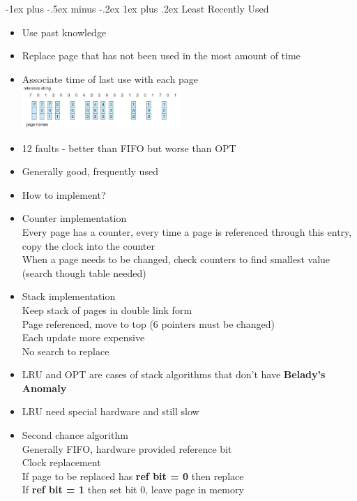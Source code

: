 \documentclass[8pt,landscape]{article}
\makeatletter
\renewcommand{\subsubsection}{\@startsection{subsubsection}{3}{0mm}%
                                {-1ex plus -.5ex minus -.2ex}%
                                {1ex plus .2ex}%
                                {\normalfont\tiny\bfseries}}
\makeatother
\begin{document}
\begin{multicols}{3}
\begin{tiny}
		\subsubsection{Least Recently Used}
		\begin{itemize}[noitemsep]
			\item Use past knowledge
			\item Replace page that has not been used in the most amount of time
			\item Associate time of last use with each page
			\begingroup
				\centering
				\includegraphics[width=6cm]{lru.png}
			\endgroup
			\item 12 faults - better than FIFO but worse than OPT
			\item Generally good, frequently used
			\item How to implement?
			\item Counter implementation\\
				Every page has a counter, every time a page is referenced through this entry, copy
				the clock into the counter\\
				When a page needs to be changed, check counters to find smallest value 
				(search though table needed)\\
			\item Stack implementation\\
				Keep stack of pages in double link form\\
				Page referenced, move to top (6 pointers must be changed)\\
				Each update more expensive\\
				No search to replace\\
			\item LRU and OPT are cases of stack algorithms that don't have 
				\textbf{Belady's Anomaly}
			\item LRU need special hardware and still slow
			\item Second chance algorithm\\
				Generally FIFO, hardware provided reference bit\\
				Clock replacement\\
				If page to be replaced has \textbf{ref bit = 0} then replace\\
				If \textbf{ref bit = 1} then set bit 0, leave page in memory


\end{itemize}
\end{tiny}
\end{multicols}
\end{document}
